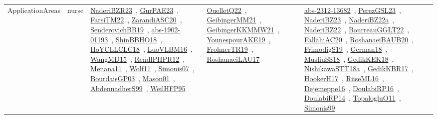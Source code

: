 {\begin{longtable}{lp{3cm}>{\raggedright\arraybackslash}p{6cm}>{\raggedright\arraybackslash}p{6cm}>{\raggedright\arraybackslash}p{8cm}}
ApplicationAreas & nurse & \href{../works/NaderiBZR23.pdf}{NaderiBZR23}~\cite{NaderiBZR23}, \href{../works/GurPAE23.pdf}{GurPAE23}~\cite{GurPAE23}, \href{../works/FarsiTM22.pdf}{FarsiTM22}~\cite{FarsiTM22}, \href{../works/ZarandiASC20.pdf}{ZarandiASC20}~\cite{ZarandiASC20}, \href{../works/SenderovichBB19.pdf}{SenderovichBB19}~\cite{SenderovichBB19}, \href{../works/abs-1902-01193.pdf}{abs-1902-01193}~\cite{abs-1902-01193}, \href{../works/ShinBBHO18.pdf}{ShinBBHO18}~\cite{ShinBBHO18}, \href{../works/HoYCLLCLC18.pdf}{HoYCLLCLC18}~\cite{HoYCLLCLC18}, \href{../works/LuoVLBM16.pdf}{LuoVLBM16}~\cite{LuoVLBM16}, \href{../works/WangMD15.pdf}{WangMD15}~\cite{WangMD15}, \href{../works/RendlPHPR12.pdf}{RendlPHPR12}~\cite{RendlPHPR12}, \href{../works/Menana11.pdf}{Menana11}~\cite{Menana11}, \href{../works/Wolf11.pdf}{Wolf11}~\cite{Wolf11}, \href{../works/Simonis07.pdf}{Simonis07}~\cite{Simonis07}, \href{../works/BourdaisGP03.pdf}{BourdaisGP03}~\cite{BourdaisGP03}, \href{../works/Mason01.pdf}{Mason01}~\cite{Mason01}, \href{../works/AbdennadherS99.pdf}{AbdennadherS99}~\cite{AbdennadherS99}, \href{../works/WeilHFP95.pdf}{WeilHFP95}~\cite{WeilHFP95} & \href{../works/OuelletQ22.pdf}{OuelletQ22}~\cite{OuelletQ22}, \href{../works/GeibingerMM21.pdf}{GeibingerMM21}~\cite{GeibingerMM21}, \href{../works/GeibingerKKMMW21.pdf}{GeibingerKKMMW21}~\cite{GeibingerKKMMW21}, \href{../works/YounespourAKE19.pdf}{YounespourAKE19}~\cite{YounespourAKE19}, \href{../works/FrohnerTR19.pdf}{FrohnerTR19}~\cite{FrohnerTR19}, \href{../works/RoshanaeiLAU17.pdf}{RoshanaeiLAU17}~\cite{RoshanaeiLAU17} & \href{../works/abs-2312-13682.pdf}{abs-2312-13682}~\cite{abs-2312-13682}, \href{../works/PerezGSL23.pdf}{PerezGSL23}~\cite{PerezGSL23}, \href{../works/NaderiBZ23.pdf}{NaderiBZ23}~\cite{NaderiBZ23}, \href{../works/NaderiBZ22a.pdf}{NaderiBZ22a}~\cite{NaderiBZ22a}, \href{../works/NaderiBZ22.pdf}{NaderiBZ22}~\cite{NaderiBZ22}, \href{../works/BourreauGGLT22.pdf}{BourreauGGLT22}~\cite{BourreauGGLT22}, \href{../works/FallahiAC20.pdf}{FallahiAC20}~\cite{FallahiAC20}, \href{../works/RoshanaeiBAUB20.pdf}{RoshanaeiBAUB20}~\cite{RoshanaeiBAUB20}, \href{../works/FrimodigS19.pdf}{FrimodigS19}~\cite{FrimodigS19}, \href{../works/German18.pdf}{German18}~\cite{German18}, \href{../works/MusliuSS18.pdf}{MusliuSS18}~\cite{MusliuSS18}, \href{../works/GedikKEK18.pdf}{GedikKEK18}~\cite{GedikKEK18}, \href{../works/NishikawaSTT18a.pdf}{NishikawaSTT18a}~\cite{NishikawaSTT18a}, \href{../works/GedikKBR17.pdf}{GedikKBR17}~\cite{GedikKBR17}, \href{../works/HookerH17.pdf}{HookerH17}~\cite{HookerH17}, \href{../works/RiiseML16.pdf}{RiiseML16}~\cite{RiiseML16}, \href{../works/Dejemeppe16.pdf}{Dejemeppe16}~\cite{Dejemeppe16}, \href{../works/DoulabiRP16.pdf}{DoulabiRP16}~\cite{DoulabiRP16}, \href{../works/DoulabiRP14.pdf}{DoulabiRP14}~\cite{DoulabiRP14}, \href{../works/TopalogluO11.pdf}{TopalogluO11}~\cite{TopalogluO11}, \href{../works/Simonis99.pdf}{Simonis99}~\cite{Simonis99}\\

\end{longtable}}
